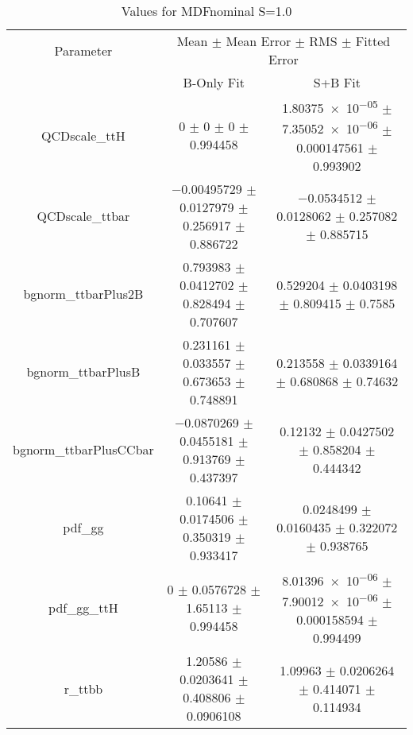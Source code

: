 \begin{table}
\centering
\caption{Values for MDFnominal S=1.0}
\begin{tabular}{ccc}
\toprule
Parameter & \multicolumn{2}{c}{Mean $\pm$ Mean Error $\pm$ RMS $\pm$ Fitted Error}\\
 & B-Only Fit & S+B Fit\\
\midrule
QCDscale\_ttH & \num{0} $\pm$ \num{0} $\pm$ \num{0} $\pm$ \num{0.994458} & \num{1.80375e-05} $\pm$ \num{7.35052e-06} $\pm$ \num{0.000147561} $\pm$ \num{0.993902}\\
QCDscale\_ttbar & \num{-0.00495729} $\pm$ \num{0.0127979} $\pm$ \num{0.256917} $\pm$ \num{0.886722} & \num{-0.0534512} $\pm$ \num{0.0128062} $\pm$ \num{0.257082} $\pm$ \num{0.885715}\\
bgnorm\_ttbarPlus2B & \num{0.793983} $\pm$ \num{0.0412702} $\pm$ \num{0.828494} $\pm$ \num{0.707607} & \num{0.529204} $\pm$ \num{0.0403198} $\pm$ \num{0.809415} $\pm$ \num{0.7585}\\
bgnorm\_ttbarPlusB & \num{0.231161} $\pm$ \num{0.033557} $\pm$ \num{0.673653} $\pm$ \num{0.748891} & \num{0.213558} $\pm$ \num{0.0339164} $\pm$ \num{0.680868} $\pm$ \num{0.74632}\\
bgnorm\_ttbarPlusCCbar & \num{-0.0870269} $\pm$ \num{0.0455181} $\pm$ \num{0.913769} $\pm$ \num{0.437397} & \num{0.12132} $\pm$ \num{0.0427502} $\pm$ \num{0.858204} $\pm$ \num{0.444342}\\
pdf\_gg & \num{0.10641} $\pm$ \num{0.0174506} $\pm$ \num{0.350319} $\pm$ \num{0.933417} & \num{0.0248499} $\pm$ \num{0.0160435} $\pm$ \num{0.322072} $\pm$ \num{0.938765}\\
pdf\_gg\_ttH & \num{0} $\pm$ \num{0.0576728} $\pm$ \num{1.65113} $\pm$ \num{0.994458} & \num{8.01396e-06} $\pm$ \num{7.90012e-06} $\pm$ \num{0.000158594} $\pm$ \num{0.994499}\\
r\_ttbb & \num{1.20586} $\pm$ \num{0.0203641} $\pm$ \num{0.408806} $\pm$ \num{0.0906108} & \num{1.09963} $\pm$ \num{0.0206264} $\pm$ \num{0.414071} $\pm$ \num{0.114934}\\
\bottomrule
\end{tabular}
\end{table}